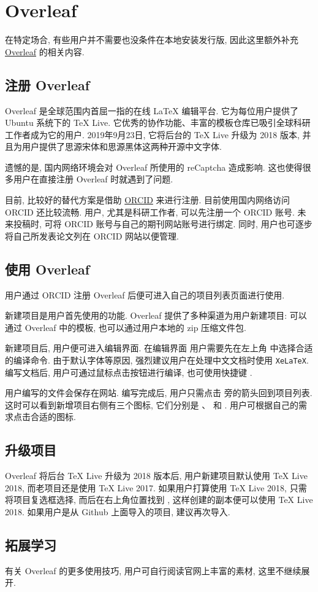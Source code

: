 
\chapter{Overleaf}

在特定场合,
有些用户并不需要也没条件在本地安装发行版,
因此这里额外补充 \href{www.overleaf.com}{Overleaf} 的相关内容.

\section{注册 Overleaf}

Overleaf 是全球范围内首屈一指的在线 \LaTeX{} 编辑平台.
它为每位用户提供了 Ubuntu 系统下的 \TeX{} Live.
它优秀的协作功能、丰富的模板仓库已吸引全球科研工作者成为它的用户.
2019年9月23日,
它将后台的 \TeX{} Live 升级为 2018 版本,
并且为用户提供了思源宋体和思源黑体这两种开源中文字体.

遗憾的是,
国内网络环境会对 Overleaf 所使用的 reCaptcha 造成影响.
这也使得很多用户在直接注册 Overleaf 时就遇到了问题.

目前,
比较好的替代方案是借助 \href{https://orcid.org}{ORCID} 来进行注册.
目前使用国内网络访问 ORCID 还比较流畅.
用户, 尤其是科研工作者, 可以先注册一个 ORCID 账号.
未来投稿时,
可将 ORCID 账号与自己的期刊网站账号进行绑定.
同时,
用户也可逐步将自己所发表论文列在 ORCID 网站以便管理.

\section{使用 Overleaf}

用户通过 ORCID 注册 Overleaf 后便可进入自己的项目列表页面进行使用.

新建项目是用户首先使用的功能.
Overleaf 提供了多种渠道为用户新建项目:
可以通过 Overleaf 中的模板,
也可以通过用户本地的 \textsf{zip} 压缩文件包.

新建项目后,
用户便可进入编辑界面.
在编辑界面
用户需要先在左上角  中选择合适的编译命令.
由于默认字体等原因,
强烈建议用户在处理中文文档时使用 \texttt{XeLaTeX}.
编写文档后,
用户可通过鼠标点击按钮进行编译,
也可使用快捷键 .

用户编写的文件会保存在网站.
编写完成后,
用户只需点击  旁的箭头回到项目列表.
这时可以看到新增项目右侧有三个图标,
它们分别是 、 和 .
用户可根据自己的需求点击合适的图标.

\section{升级项目}

Overleaf 将后台 \TeX{} Live 升级为 2018 版本后,
用户新建项目默认使用 \TeX{} Live 2018,
而老项目还是使用 \TeX{} Live 2017.
如果用户打算使用 \TeX{} Live 2018,
只需将项目复选框选择,
而后在右上角位置找到 ,
这样创建的副本便可以使用 \TeX{} Live 2018.
如果用户是从 Github 上面导入的项目,
建议再次导入.

\section{拓展学习}

有关 Overleaf 的更多使用技巧,
用户可自行阅读官网上丰富的素材,
这里不继续展开.
